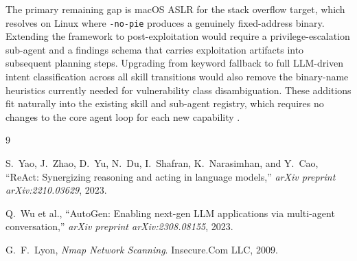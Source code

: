 \documentclass[conference]{IEEEtran}
\begin{document}
The primary remaining gap is macOS ASLR for the stack overflow target, which resolves on Linux where \texttt{-no-pie} produces a genuinely fixed-address binary. Extending the framework to post-exploitation would require a privilege-escalation sub-agent and a findings schema that carries exploitation artifacts into subsequent planning steps. Upgrading from keyword fallback to full LLM-driven intent classification across all skill transitions would also remove the binary-name heuristics currently needed for vulnerability class disambiguation. These additions fit naturally into the existing skill and sub-agent registry, which requires no changes to the core agent loop for each new capability \cite{autogen}.

\begin{thebibliography}{9}

S.~Yao, J.~Zhao, D.~Yu, N.~Du, I.~Shafran, K.~Narasimhan, and Y.~Cao, ``ReAct: Synergizing reasoning and acting in language models,'' \textit{arXiv preprint arXiv:2210.03629}, 2023.

Q.~Wu et al., ``AutoGen: Enabling next-gen LLM applications via multi-agent conversation,'' \textit{arXiv preprint arXiv:2308.08155}, 2023.

G.~F.~Lyon, \textit{Nmap Network Scanning}. Insecure.Com LLC, 2009.

\end{thebibliography}
\end{document}
